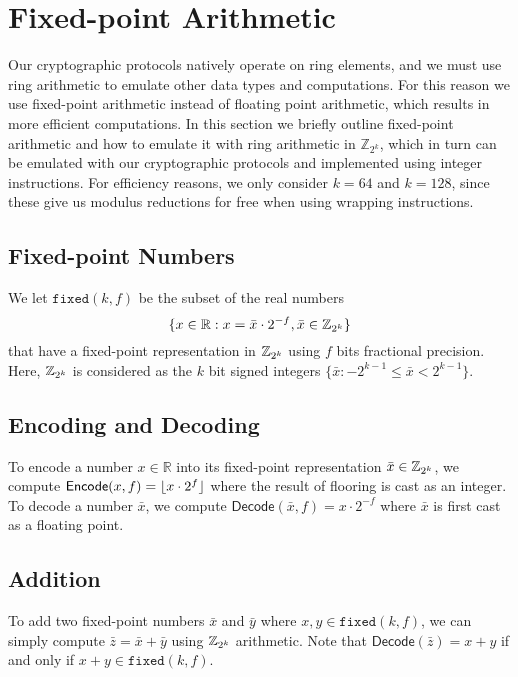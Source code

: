 \section{Fixed-point Arithmetic}
\label{sec:fixed-point}


Our cryptographic protocols natively operate on ring elements, and we must use ring arithmetic to emulate other data types and computations. For this reason we use fixed-point arithmetic instead of floating point arithmetic, which results in more efficient computations. In this section we briefly outline fixed-point arithmetic and how to emulate it with ring arithmetic in $\mathbb{Z}_{2^k}$, which in turn can be emulated with our cryptographic protocols and implemented using integer instructions. For efficiency reasons, we only consider $k = 64$ and $k = 128$, since these give us modulus reductions for free when using wrapping instructions.

\subsection{Fixed-point Numbers}
We let $\mathtt{fixed}(k, f)$ be the subset of the real numbers
$$
\{x \in \mathbb{R} : x = \bar{x} \cdot 2^{-f}, \bar{x} \in \mathbb{Z}_{2^k} \}
$$
that have a fixed-point representation in $\mathbb{Z}_{2^k}$ using $f$ bits fractional precision. Here, $\mathbb{Z}_{2^k}$ is considered as the $k$ bit signed integers $\{ \bar{x} : -2^{k-1} \leq \bar{x} < 2^{k-1} \}$.

\subsection{Encoding and Decoding}
To encode a number $x \in \mathbb{R}$ into its fixed-point representation $\bar{x} \in \mathbb{Z}_{2^k}$, we compute $\mathsf{Encode}(x, f) = \lfloor x \cdot 2^f\rfloor$ where the result of flooring is cast as an integer. To decode a number $\bar{x}$, we compute $\mathsf{Decode}(\bar{x}, f) = x \cdot 2^{-f}$ where $\bar{x}$ is first cast as a floating point.

\subsection{Addition}
To add two fixed-point numbers $\bar{x}$ and $\bar{y}$ where $x,y \in \mathtt{fixed}(k, f)$, we can simply compute $\bar{z} = \bar{x} + \bar{y}$ using $\mathbb{Z}_{2^k}$ arithmetic. Note that $\mathsf{Decode}(\bar{z}) = x + y$ if and only if $x + y \in \mathtt{fixed}(k, f)$.

